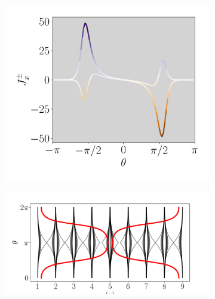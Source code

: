 \begin{figure}[h!]
     
     \begin{minipage}[h!]{1\textwidth}
         \begin{subfigure}[b!]{0.37 \textwidth}
             \caption{}
             \includegraphics[width=\textwidth]{Imagenes/Resultados_pump_Cuadrado/xy/current_square_pump_pn.pdf}
             \label{}
         \end{subfigure}\hspace{-0.5em}
         \begin{subfigure}[b!]{0.63 \textwidth}
             \caption{}
             \includegraphics[width=\textwidth]{Imagenes/Resultados_pump_Cuadrado/xy/wannier_center.pdf}
             \label{}
         \end{subfigure}\hspace*{-0.5em}
     \end{minipage}\vspace*{-1em}
     
     
    \caption{}
    \label{fig:Pump_cuadrado_xy}
\end{figure}